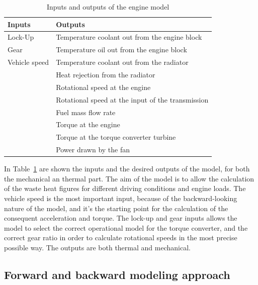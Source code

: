 \begin{table}[]
  \centering
  \begin{tabular}{ll}
    \hline
    Inputs        & Outputs                                           \\ \hline
    Lock-Up       & Temperature coolant out from the engine block     \\
    Gear          & Temperature oil out from the engine block         \\
    Vehicle speed & Temperature coolant out from the radiator         \\
                  & Heat rejection from the radiator                  \\
                  & Rotational speed at the engine                    \\
                  & Rotational speed at the input of the transmission \\
                  & Fuel mass flow rate                               \\
                  & Torque at the engine                              \\
                  & Torque at the torque converter turbine            \\
                  & Power drawn by the fan                            \\ \hline
  \end{tabular}
  \caption{Inputs and outputs of the engine model\label{tab:inputs_outputs}}
\end{table}

In Table~\ref{tab:inputs_outputs} are shown the inputs and the desired outputs of the model, for both the mechanical an thermal part. The aim of the model is to allow the calculation of the waste heat figures for different driving conditions and engine loads. The vehicle speed is the most important input, because of the backward-looking nature of the model, and it's the starting point for the calculation of the consequent acceleration and torque. The lock-up and gear inputs allows the model to select the correct operational model for the torque converter, and the correct gear ratio in order to calculate rotational speeds in the most precise possible way. The outputs are both thermal and mechanical.

\subsection{Forward and backward modeling approach}
\label{sub:forward_backward}

